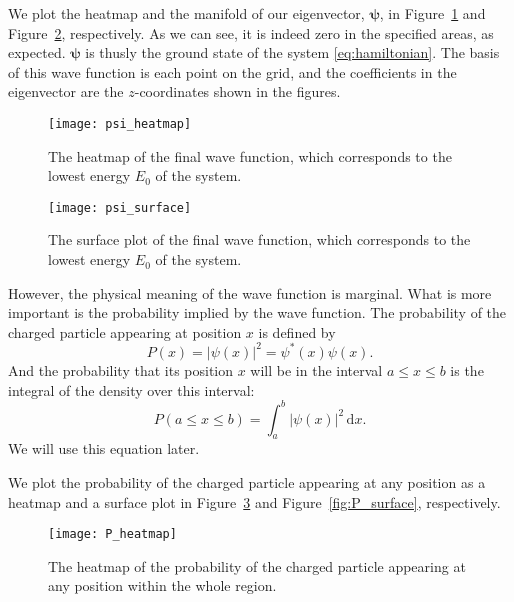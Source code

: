 We plot the heatmap and the manifold of our eigenvector, $\bm{\psi}$, in
Figure~\ref{fig:psi_heatmap} and Figure~\ref{fig:psi_surface}, respectively.
As we can see, it is indeed zero in the specified areas, as expected.
$\bm{\psi}$ is thusly the ground state of the system \eqref{eq:hamiltonian}.
The basis of this wave function is each point on the grid, and the coefficients
in the eigenvector are the $z$-coordinates shown in the figures.

\begin{figure}[!hbt]
    \centering
    \texttt{[image: psi\_heatmap]}
    \caption{The heatmap of the final wave function, which corresponds to the
        lowest energy $E_0$ of the system.}
    \label{fig:psi_heatmap}
\end{figure}

\begin{figure}[!hbt]
    \centering
    \texttt{[image: psi\_surface]}
    \caption{The surface plot of the final wave function, which corresponds to the
        lowest energy $E_0$ of the system.}
    \label{fig:psi_surface}
\end{figure}

However, the physical meaning of the wave function is marginal.
What is more important is the probability implied by the wave function.
The probability of the charged particle appearing at position $x$ is defined by
%
\begin{equation}
    P(x) = | \psi(x) |^2 = \psi^\ast(x) \psi(x).
\end{equation}
%
And the probability that its position $x$ will be in the interval $a \leq x \leq b$ is the
integral of the density over this interval:
%
\begin{equation}\label{eq:Prange}
    P(a \leq x \leq b) = \int_{a}^{b} | \psi(x) |^2 \, \mathrm{d}x.
\end{equation}
%
We will use this equation later.

We plot the probability of the charged particle appearing at any position
as a heatmap and a surface plot in Figure~\ref{fig:P_heatmap} and Figure~\ref{fig:P_surface},
respectively.

\begin{figure}[!hbt]
    \centering
    \texttt{[image: P\_heatmap]}
    \caption{The heatmap of the probability of the charged particle appearing at any
        position within the whole region.}
    \label{fig:P_heatmap}
\end{figure}

